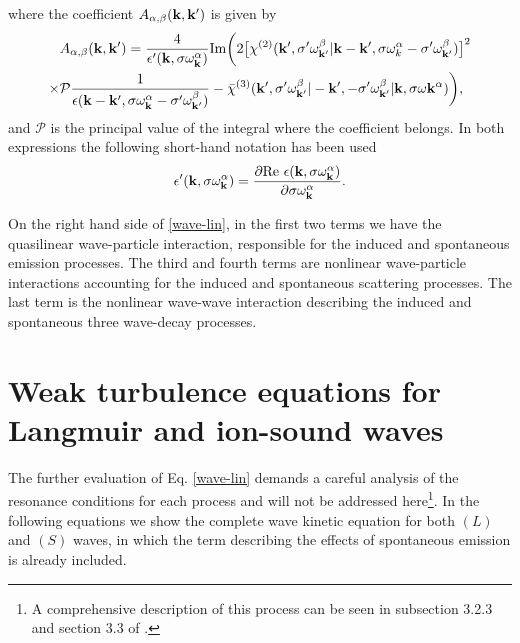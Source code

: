 \documentclass[12pt,a4paper,ruledheader]{report}
\begin{document}
where the coefficient $A_{\alpha,\beta}({\bf k,k'})$ is given by
\begin{equation}
\begin{split}
  &A_{\alpha,\beta}({\bf k,k'})
  =\frac{4}{\epsilon '({\bf k},\sigma \omega_{\bf k}^{\alpha})}
  \mbox{Im}\biggl(2\bigl[\chi^{(2)}({\bf k'},\sigma ' \omega_{\bf k'}^{\beta}|
    {\bf k-k'},\sigma \omega_{k}^{\alpha}-\sigma ' \omega_{\bf k'}^{\beta})\bigr]^2\\
    \times&{\cal P}\frac{1}{\epsilon({\bf k-k'},\sigma \omega_{\bf k}^{\alpha}
        -\sigma ' \omega_{\bf k'}^{\beta})}
       -\bar \chi^{(3)}({\bf k'},\sigma ' \omega_{\bf k'}^{\beta}|-{\bf k'},
       -\sigma ' \omega_{\bf k'}^{\beta}|{\bf k},
       \sigma \omega{\bf k}^{\alpha})\biggr),
       \label{coef-esp}
\end{split}
\end{equation}
and $\mathcal{P}$ is the principal value of the integral where
the coefficient belongs. In both expressions the following
short-hand notation has been used
\begin{equation}
\epsilon '({\bf k},\sigma \omega_{\bf k}^{\alpha})
=\frac{\partial \mbox{Re}\ \epsilon ({\bf k},\sigma \omega_{\bf k}^{\alpha})}
{\partial \sigma \omega_{\bf k}^{\alpha}}.
\end{equation}

On the right hand side of \eqref{wave-lin}, in the first two terms
we have the quasilinear wave-particle interaction, responsible for
the induced and spontaneous emission processes. The third and fourth
terms are nonlinear wave-particle interactions accounting for the
induced and spontaneous scattering processes. The last term is the
nonlinear wave-wave interaction describing the induced and spontaneous
three wave-decay processes. 


\section{Weak turbulence equations for Langmuir and ion-sound waves}
The further evaluation of Eq. \eqref{wave-lin} demands a careful
analysis of the resonance conditions for each process and will not
be addressed here\footnote{A comprehensive description of this
  process can be seen in subsection 3.2.3 and section 3.3 of
  \cite{Tigik2015}.}. In the following equations we show the complete
wave kinetic equation for both $(L)$ and $(S)$ waves, in which the term
describing the effects of spontaneous emission is already included.
\end{document}
